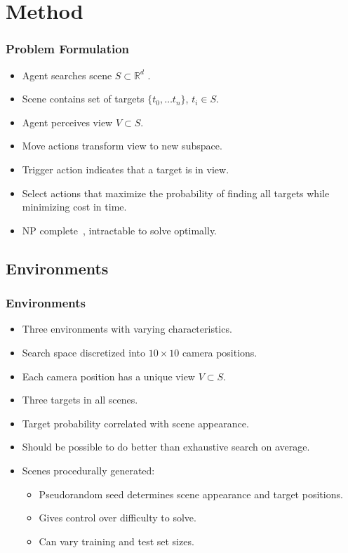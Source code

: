 \section{Method}

\begin{frame}
    \frametitle{Problem Formulation}

    \begin{itemize}
        \item Agent searches scene \(S \subset \mathbb{R}^d\) .
        \item Scene contains set of targets \(\{t_0, \dots t_n\}\), \(t_i \in S\).
        \item Agent perceives view \(V \subset S\).
        \item Move actions transform view to new subspace.
        \item Trigger action indicates that a target is in view.
        \item Select actions that maximize the probability of finding all targets while minimizing cost in time.
        \item NP complete~\cite{ye_tsotsos_2001}, intractable to solve optimally.
    \end{itemize}
\end{frame}

\subsection{Environments}

\begin{frame}
    \frametitle{Environments}
    
    \begin{itemize}
        \item Three environments with varying characteristics.
        \item Search space discretized into \(10 \times 10\) camera positions.
        \item Each camera position has a unique view \(V \subset S\).
        \item Three targets in all scenes.
        \item Target probability correlated with scene appearance.
        \item Should be possible to do better than exhaustive search on average.
        \item Scenes procedurally generated:
        \begin{itemize}
            \item Pseudorandom seed determines scene appearance and target positions.
            \item Gives control over difficulty to solve.
            \item Can vary training and test set sizes.
        \end{itemize}
    \end{itemize}
\end{frame}


